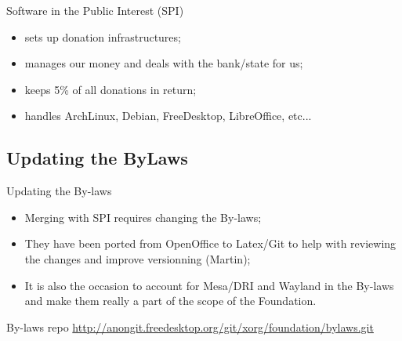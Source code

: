 \documentclass{beamer}
\begin{document}
		\begin{frame}
			\begin{block}{Software in the Public Interest (SPI)}
				\begin{itemize}
					\item sets up donation infrastructures;
					\item manages our money and deals with the bank/state for us;
					\item keeps 5\% of all donations in return;
					\item handles ArchLinux, Debian, FreeDesktop, LibreOffice, etc...
				\end{itemize}
			\end{block}
		\end{frame}

		\subsection{Updating the ByLaws}
		\begin{frame}
			\begin{block}{Updating the By-laws}
				\begin{itemize}
					\item Merging with SPI requires changing the By-laws;
					\item They have been ported from OpenOffice to Latex/Git to help with
reviewing the changes and improve versionning (Martin);
					\item It is also the occasion to account for 
Mesa/DRI and Wayland in the By-laws and make them really a part of the scope of the Foundation.
				\end{itemize}
			\end{block}

			\begin{block}{By-laws repo}
				\url{http://anongit.freedesktop.org/git/xorg/foundation/bylaws.git}
			\end{block}
		\end{frame}
\end{document}
